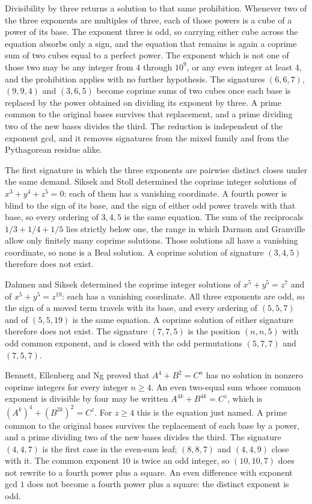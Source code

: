 \documentclass[a4paper]{article}
\theoremstyle{definition}
\theoremstyle{remark}
\begin{document}
Divisibility by three returns a solution to that same prohibition. Whenever two of the three exponents are multiples of three, each of those powers is a cube of a power of its base. The exponent three is odd, so carrying either cube across the equation absorbs only a sign, and the equation that remains is again a coprime sum of two cubes equal to a perfect power. The exponent which is not one of those two may be any integer from \( 4 \) through \( 10^9 \), or any even integer at least \( 4 \), and the prohibition applies with no further hypothesis. The signatures \( (6,6,7) \), \( (9,9,4) \) and \( (3,6,5) \) become coprime sums of two cubes once each base is replaced by the power obtained on dividing its exponent by three. A prime common to the original bases survives that replacement, and a prime dividing two of the new bases divides the third. The reduction is independent of the exponent gcd, and it removes signatures from the mixed family and from the Pythagorean residue alike.

The first signature in which the three exponents are pairwise distinct closes under the same demand. Siksek and Stoll determined the coprime integer solutions of \( x^3+y^4+z^5=0 \): each of them has a vanishing coordinate. A fourth power is blind to the sign of its base, and the sign of either odd power travels with that base, so every ordering of \( 3,4,5 \) is the same equation. The sum of the reciprocals \( 1/3+1/4+1/5 \) lies strictly below one, the range in which Darmon and Granville allow only finitely many coprime solutions. Those solutions all have a vanishing coordinate, so none is a Beal solution. A coprime solution of signature \( (3,4,5) \) therefore does not exist.

Dahmen and Siksek determined the coprime integer solutions of \( x^5+y^5=z^7 \) and of \( x^5+y^5=z^{19} \): each has a vanishing coordinate. All three exponents are odd, so the sign of a moved term travels with its base, and every ordering of \( (5,5,7) \) and of \( (5,5,19) \) is the same equation. A coprime solution of either signature therefore does not exist. The signature \( (7,7,5) \) is the position \( (n,n,5) \) with odd common exponent, and is closed with the odd permutations \( (5,7,7) \) and \( (7,5,7) \).

Bennett, Ellenberg and Ng proved that \( A^4+B^2=C^n \) has no solution in nonzero coprime integers for every integer \( n\ge 4 \). An even two-equal sum whose common exponent is divisible by four may be written \( A^{4k}+B^{4k}=C^z \), which is \( (A^k)^4+(B^{2k})^2=C^z \). For \( z\ge 4 \) this is the equation just named. A prime common to the original bases survives the replacement of each base by a power, and a prime dividing two of the new bases divides the third. The signature \( (4,4,7) \) is the first case in the even-sum leaf; \( (8,8,7) \) and \( (4,4,9) \) close with it. The common exponent \( 10 \) is twice an odd integer, so \( (10,10,7) \) does not rewrite to a fourth power plus a square. An even difference with exponent gcd \( 1 \) does not become a fourth power plus a square: the distinct exponent is odd.
\end{document}

